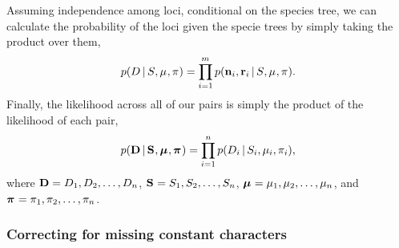 Assuming independence among loci, conditional on the species tree, we can
calculate the probability of the \nloci loci given the specie trees by simply
taking the product over them,
\begin{equation}
    \pr(\comparisondata \given \sptree, \murate, \gfreq)
    =
    \prod_{i=1}^{\nloci}
    \pr(\leafallelecounts[i], \leafredallelecounts[i] \given \sptree, \murate, \gfreq).
    \label{eq:comparisonlikelihood}
\end{equation}
Finally, the likelihood across all of our pairs is simply the product of the
likelihood of each pair,
\begin{equation}
    \pr(
    \alldata
    \given
    \sptrees,
    \murates,
    \gfreqs)
    =
    \prod_{i=1}^{\ncomparisons}
    \pr(\comparisondata[i] \given \sptree[i], \murate[i], \gfreq[i]),
    \label{eq:collectionlikelihood}
\end{equation}
where
$\alldata = \comparisondata[1], \comparisondata[2], \ldots, \comparisondata[\ncomparisons]$,
$\sptrees = \sptree[1], \sptree[2], \ldots, \sptree[\ncomparisons]$,
$\murates = \murate[1], \murate[2], \ldots, \murate[\ncomparisons]$,
and
$\gfreqs = \gfreq[1], \gfreq[2], \ldots, \gfreq[\ncomparisons]$.


\subsubsection{Correcting for missing constant characters}

